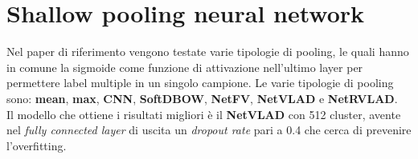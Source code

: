 \section{Shallow pooling neural network}
Nel paper di riferimento vengono testate varie tipologie di pooling, le quali hanno in comune la sigmoide come funzione di attivazione nell'ultimo layer per permettere label multiple in un singolo campione.
Le varie tipologie di pooling sono: \textbf{mean}, \textbf{max}, \textbf{CNN}, \textbf{SoftDBOW}, \textbf{NetFV}, \textbf{NetVLAD} e \textbf{NetRVLAD}.
\\Il modello che ottiene i risultati migliori è il \textbf{NetVLAD} con 512 cluster, avente nel \textit{fully connected layer} di uscita un  \textit{dropout rate} pari a 0.4 che cerca di prevenire l'overfitting.

